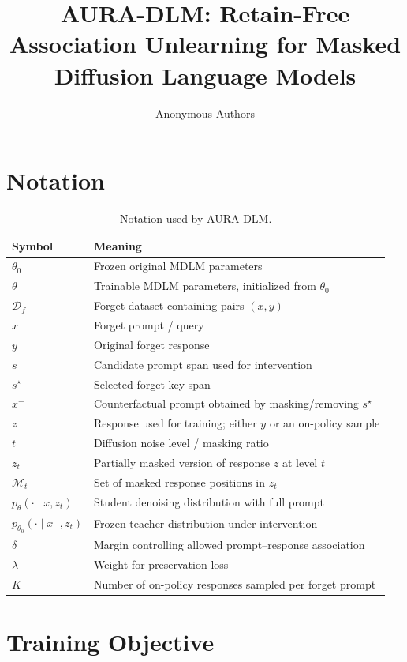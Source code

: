 \documentclass{article}
\title{AURA-DLM: Retain-Free Association Unlearning for Masked Diffusion Language Models}
\author{Anonymous Authors}
\begin{document}
\maketitle

\section{Notation}

\begin{table}[t]
\centering
\small
\begin{tabular}{ll}
\toprule
Symbol & Meaning \\
\midrule
$\theta_0$ & Frozen original MDLM parameters \\
$\theta$ & Trainable MDLM parameters, initialized from $\theta_0$ \\
$\mathcal{D}_f$ & Forget dataset containing pairs $(x,y)$ \\
$x$ & Forget prompt / query \\
$y$ & Original forget response \\
$s$ & Candidate prompt span used for intervention \\
$s^\star$ & Selected forget-key span \\
$x^{-}$ & Counterfactual prompt obtained by masking/removing $s^\star$ \\
$z$ & Response used for training; either $y$ or an on-policy sample \\
$t$ & Diffusion noise level / masking ratio \\
$z_t$ & Partially masked version of response $z$ at level $t$ \\
$\mathcal{M}_t$ & Set of masked response positions in $z_t$ \\
$p_\theta(\cdot \mid x,z_t)$ & Student denoising distribution with full prompt \\
$p_{\theta_0}(\cdot \mid x^{-},z_t)$ & Frozen teacher distribution under intervention \\
$\delta$ & Margin controlling allowed prompt--response association \\
$\lambda$ & Weight for preservation loss \\
$K$ & Number of on-policy responses sampled per forget prompt \\
\bottomrule
\end{tabular}
\caption{Notation used by AURA-DLM.}
\label{tab:notation}
\end{table}

\section{Training Objective}
\end{document}
